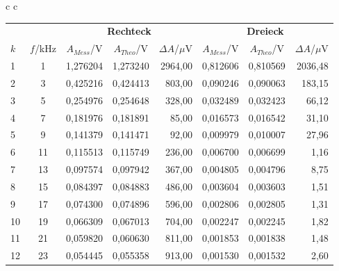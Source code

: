 \newpage
\begin{center}
    \begin{tabular}{c c}
        \begin{tabular}{l | c | c c r | c c r}
            \multicolumn{2}{c}{} & \multicolumn{3}{c}{\textbf{Rechteck}} & \multicolumn{3}{c}{\textbf{Dreieck}}\\
            $k$ & $f$/kHz  &   $A_{Mess}$/V & $A_{Theo}$/V & $\Delta A$/$\mu$V  &   $A_{Mess}$/V & $A_{Theo}$/V & $\Delta A$/$\mu$V\\
            \hline
            1  &       1 &  1,276204 &  1,273240 & 2964,00 & 0,812606 &  0,810569 & 2036,48 \\
            2  &       3 &  0,425216 &  0,424413 &  803,00 & 0,090246 &  0,090063 &  183,15 \\
            3  &       5 &  0,254976 &  0,254648 &  328,00 & 0,032489 &  0,032423 &   66,12 \\
            4  &       7 &  0,181976 &  0,181891 &   85,00 & 0,016573 &  0,016542 &   31,10 \\
            5  &       9 &  0,141379 &  0,141471 &   92,00 & 0,009979 &  0,010007 &   27,96 \\
            6  &      11 &  0,115513 &  0,115749 &  236,00 & 0,006700 &  0,006699 &    1,16 \\
            7  &      13 &  0,097574 &  0,097942 &  367,00 & 0,004805 &  0,004796 &    8,75 \\
            8  &      15 &  0,084397 &  0,084883 &  486,00 & 0,003604 &  0,003603 &    1,51 \\
            9  &      17 &  0,074300 &  0,074896 &  596,00 & 0,002806 &  0,002805 &    1,31 \\
            10 &      19 &  0,066309 &  0,067013 &  704,00 & 0,002247 &  0,002245 &    1,82 \\
            11 &      21 &  0,059820 &  0,060630 &  811,00 & 0,001853 &  0,001838 &    1,48 \\
            12 &      23 &  0,054445 &  0,055358 &  913,00 & 0,001530 &  0,001532 &    2,60 \\

\end{tabular}
\end{tabular}
\end{center}
